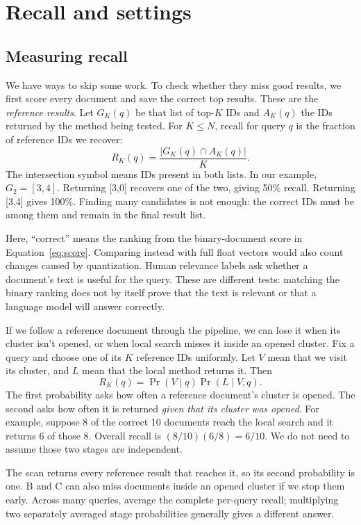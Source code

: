 \section{Recall and settings}
\subsection{Measuring recall}
We have ways to skip some work. To check whether they miss good results, we first score every
document and save the correct top results. These are the \emph{reference results}.
Let $G_K(q)$ be that list of top-$K$ IDs and $A_K(q)$ the IDs returned by the method being tested.
For $K\le N$, recall for query $q$ is the fraction of reference IDs we recover:
\begin{equation}
R_K(q)=\frac{|G_K(q)\cap A_K(q)|}{K}.
\label{eq:recall}
\end{equation}
The intersection symbol means IDs present in both lists. In our example, $G_2=[3,4]$.
Returning [3,0] recovers one of the two, giving 50\% recall. Returning [3,4] gives 100\%.
Finding many candidates is not enough: the correct IDs must be among them and remain in the
final result list.

Here, ``correct'' means the ranking from the binary-document score in
Equation~\ref{eq:score}. Comparing instead with full float vectors would also count changes
caused by quantization. Human relevance labels ask whether a document's text is useful for
the query. These are different tests: matching the binary ranking does not by itself prove
that the text is relevant or that a language model will answer correctly.

If we follow a reference document through the pipeline, we can lose it when its cluster isn't
opened, or when local search misses it inside an opened cluster. Fix a query and choose one
of its $K$ reference IDs uniformly. Let $V$ mean that we visit its cluster, and $L$ mean that
the local method returns it. Then
\begin{equation}
R_K(q)=\Pr(V\mid q)\Pr(L\mid V,q).
\label{eq:survival}
\end{equation}
The first probability asks how often a reference document's cluster is opened. The second
asks how often it is returned \emph{given that its cluster was opened}. For example, suppose
8 of the correct 10 documents reach the local search and it returns 6 of those 8. Overall
recall is $(8/10)(6/8)=6/10$. We do not need to assume those two stages are independent.

The scan returns every reference result that reaches it, so its second probability is one.
B and C can also miss documents inside an opened cluster if we stop them early. Across many
queries, average the complete per-query recall; multiplying two separately averaged stage
probabilities generally gives a different answer.

